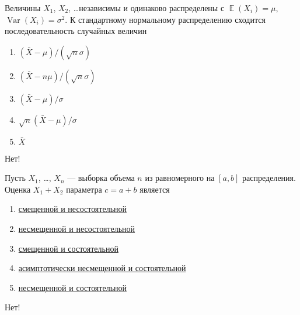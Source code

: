 \documentclass[t]{beamer}
\DeclareMathOperator{\Var}{Var}
\DeclareMathOperator{\E}{\mathbb{E}}
\begin{document}
 \begin{frame} \label{31-No} 
\begin{block}{31} 

Величины $X_1$, $X_2$, \ldots независимы и одинаково распределены с $\E(X_i)=\mu$, $\Var(X_i)=\sigma^2$. К стандартному нормальному распределению  сходится последовательность случайных величин
 


 \end{block} 
\begin{enumerate} 
\item[] \hyperlink{31-No}{\beamergotobutton{} $(\bar X - \mu) /(\sqrt{n}\sigma)$}
\item[] \hyperlink{31-No}{\beamergotobutton{} $(\bar X - n\mu) /(\sqrt{n}\sigma)$}
\item[] \hyperlink{31-No}{\beamergotobutton{} $(\bar X - \mu) /\sigma$}
\item[] \hyperlink{31-Yes}{\beamergotobutton{} $\sqrt{n}(\bar X - \mu) /\sigma$ }
\item[] \hyperlink{31-No}{\beamergotobutton{} $\bar X$}
\end{enumerate} 

 \alert{Нет!} 
\end{frame} 


 \begin{frame} \label{32-No} 
\begin{block}{32} 

Пусть $X_1$, \ldots, $X_n$ — выборка объема $n$ из равномерного на $[a, b]$ распределения. Оценка $X_1+X_2$ параметра $c=a+b$ является
 


 \end{block} 
\begin{enumerate} 
\item[] \hyperlink{32-No}{\beamergotobutton{} смещенной и несостоятельной}
\item[] \hyperlink{32-Yes}{\beamergotobutton{} несмещенной и несостоятельной}
\item[] \hyperlink{32-No}{\beamergotobutton{} смещенной и состоятельной}
\item[] \hyperlink{32-No}{\beamergotobutton{} асимптотически несмещенной и состоятельной}
\item[] \hyperlink{32-No}{\beamergotobutton{} несмещенной и состоятельной}
\end{enumerate} 

 \alert{Нет!} 
\end{frame} 
\end{document}
